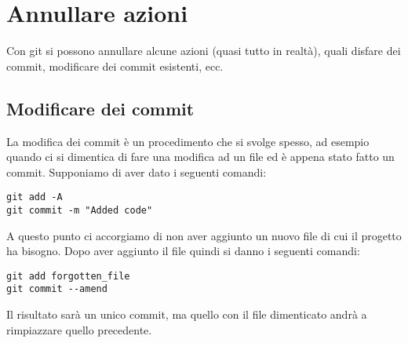 \documentclass[a4paper, 11pt]{article}
\begin{document}
	\section{Annullare azioni}
	Con git si possono annullare alcune azioni (quasi tutto in realtà), quali disfare dei commit, modificare dei commit esistenti, ecc.
	
	\subsection{Modificare dei commit}
	La modifica dei commit è un procedimento che si svolge spesso, ad esempio quando ci si dimentica di fare una modifica ad un file ed è appena stato fatto un commit. Supponiamo di aver dato i seguenti comandi: \begin{lstlisting}
git add -A
git commit -m "Added code"
	\end{lstlisting}
	
	A questo punto ci accorgiamo di non aver aggiunto un nuovo file di cui il progetto ha bisogno. Dopo aver aggiunto il file quindi si danno i seguenti comandi: \begin{lstlisting}
git add forgotten_file
git commit --amend
	\end{lstlisting}
	
	Il risultato sarà un unico commit, ma quello con il file dimenticato andrà a rimpiazzare quello precedente.	
	
	
	

	


	
	
	
	
	
	
	
	
\end{document}
